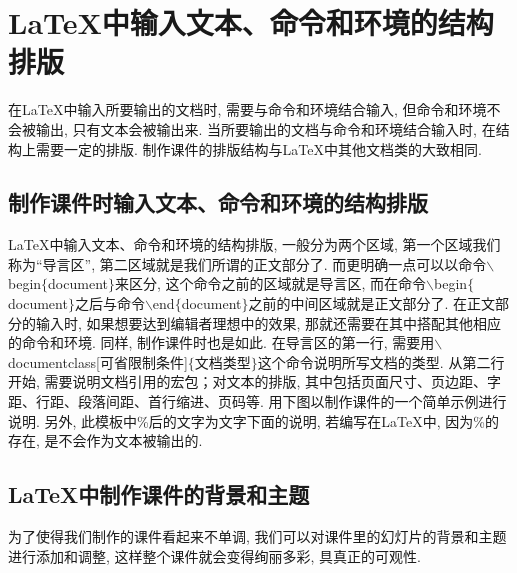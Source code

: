 \section{\LaTeX{}中输入文本、命令和环境的结构排版}

在\LaTeX{}中输入所要输出的文档时, 需要与命令和环境结合输入, 但命令和环境不会被输出, 只有文本会被输出来. 当所要输出的文档与命令和环境结合输入时, 在结构上需要一定的排版. 制作课件的排版结构与\LaTeX{}中其他文档类的大致相同.
\subsection{制作课件时输入文本、命令和环境的结构排版}

\LaTeX{}中输入文本、命令和环境的结构排版, 一般分为两个区域, 第一个区域我们称为“导言区”, 第二区域就是我们所谓的正文部分了. 而更明确一点可以以命令$\backslash$begin$\{$document$\}$来区分, 这个命令之前的区域就是导言区, 而在命令$\backslash$begin$\{$documen\-t$\}$之后与命令$\backslash$end$\{$document$\}$之前的中间区域就是正文部分了. 在正文部分的输入时, 如果想要达到编辑者理想中的效果, 那就还需要在其中搭配其他相应的命令和环境. 同样, 制作课件时也是如此. 在导言区的第一行, 需要用$\backslash$documentclass[可省限制条件]$\{$文档类型$\}$这个命令说明所写文档的类型. 从第二行开始, 需要说明文档引用的宏包；对文本的排版, 其中包括页面尺寸、页边距、字距、行距、段落间距、首行缩进、页码等. 用下图以制作课件的一个简单示例进行说明. 另外, 此模板中\%后的文字为文字下面的说明, 若编写在\LaTeX{}中, 因为\%的存在, 是不会作为文本被输出的.

\subsection{\LaTeX{}中制作课件的背景和主题}
为了使得我们制作的课件看起来不单调, 我们可以对课件里的幻灯片的背景和主题进行添加和调整, 这样整个课件就会变得绚丽多彩, 具真正的可观性.\vspace*{-10pt}


